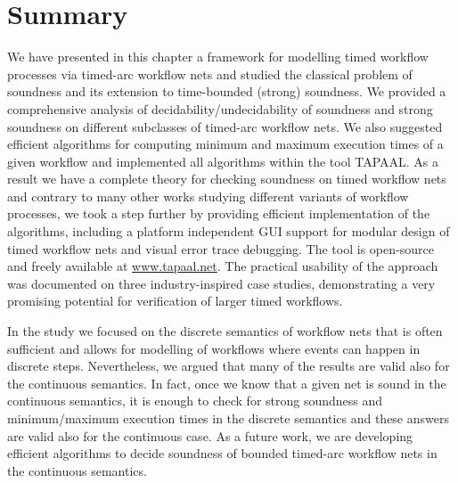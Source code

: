 \section{Summary}\label{sumWorkflow}

We have presented in this chapter a framework for modelling timed workflow processes
via timed-arc workflow nets and studied the classical problem of
soundness and its extension to time-bounded (strong) soundness.
We provided a comprehensive analysis of decidability/undecidability
of soundness and strong soundness on different subclasses of timed-arc
workflow nets. We also suggested efficient algorithms for computing
minimum and maximum execution times of a given workflow and implemented
all algorithms within the tool TAPAAL. 
As a result we have a complete theory for checking soundness on
timed workflow nets and contrary to many other works studying
different variants of workflow processes, we took a step further
by providing efficient implementation of the algorithms, including
a platform independent GUI support for modular design of timed
workflow nets and visual error trace debugging. The tool is open-source
and freely available at \url{www.tapaal.net}.
The practical usability of 
the approach was documented on three industry-inspired case studies,
demonstrating a very promising potential for verification of larger
timed workflows.

In the study we focused on the discrete semantics 
of workflow nets that is often sufficient and allows for modelling
of workflows where events can happen in discrete steps.
Nevertheless, we argued that many of the results
are valid also for the continuous semantics. In fact, once we
know that a given net is sound in the continuous semantics,
it is enough to check for strong soundness and minimum/maximum
execution times in the discrete semantics and these answers
are valid also for the continuous case. As a future work, we 
are developing efficient algorithms to decide soundness 
of bounded timed-arc workflow nets in the continuous semantics.
